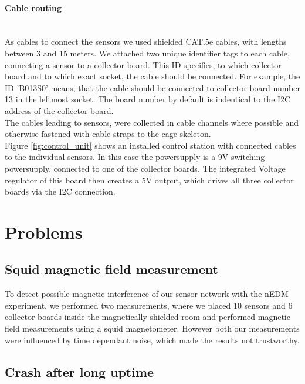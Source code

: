 \documentclass[a4paper]{scrreprt}
\begin{document}
\paragraph{Cable routing}\hspace{1cm}\\
As cables to connect the sensors we used shielded CAT.5e cables, with lengths between 3 and 15 meters.
We attached two unique identifier tags to each cable, connecting a sensor to a collector
board. This ID specifies, to which collector board and to which exact socket,
the cable should be connected. For example, the ID 'B013S0' means, that the cable should
be connected to collector board number 13 in the leftmost socket. The board number by default is indentical to the I2C address of the collector board.\\
The cables leading to sensors, were collected in cable channels where possible and otherwise
fastened with cable straps to the cage skeleton.\\
Figure \ref{fig:control_unit} shows an installed control station with connected cables to
the individual sensors. In this case the powersupply is a 9V switching powersupply, connected
to one of the collector boards. The integrated Voltage regulator of this board then creates
a 5V output, which drives all three collector boards via the I2C connection.
\section{Problems}
\subsection{Squid magnetic field measurement}
To detect possible magnetic interference of our sensor network with the nEDM experiment,
we performed two measurements, where
we placed 10 sensors and 6 collector boards inside the magnetically shielded room and performed
magnetic field measurements using a squid magnetometer. However both our measurements were
influenced by time dependant noise, which made the results not trustworthy.
\subsection{Crash after long uptime}
\end{document}
